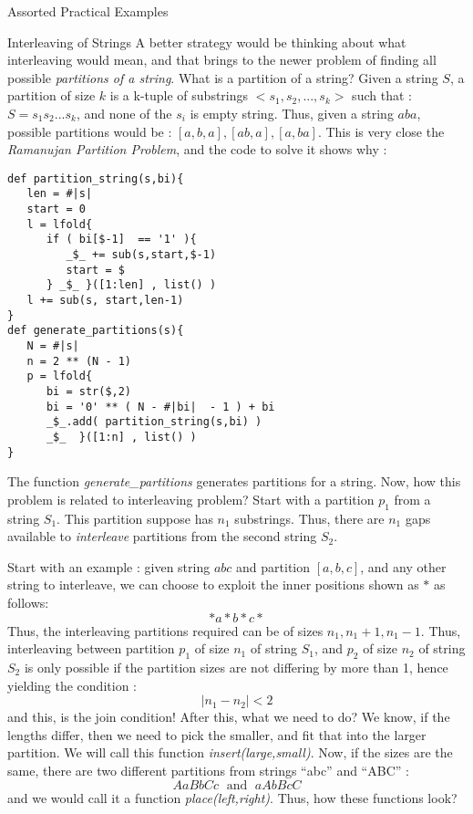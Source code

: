 \begin{section}{Assorted Practical Examples}
\begin{subsection}{Interleaving of Strings}
A better strategy would be thinking about what interleaving would mean,
and that brings to the newer problem of finding all possible \emph{partitions of a string}.
What is a partition of a string? Given a string $S$, a partition of size $k$ is a k-tuple 
of substrings $<s_1, s_2,...,s_k>$ such that  : $S = s_1s_2...s_k$, 
and none of the $s_i$ is empty string. Thus, given a string $aba$, possible partitions would be :
$[a,b,a], [ab,a], [a,ba] $. This is very close the \emph{Ramanujan Partition Problem}, and 
the code to solve it shows why :
 
\begin{center}\begin{minipage}{\linewidth}
\begin{lstlisting}[style=JexlStyle]
def partition_string(s,bi){
   len = #|s| 
   start = 0 
   l = lfold{
      if ( bi[$-1]  == '1' ){
         _$_ += sub(s,start,$-1) 
         start = $ 
      } _$_ }([1:len] , list() )
   l += sub(s, start,len-1) 
}
def generate_partitions(s){
   N = #|s|
   n = 2 ** (N - 1)
   p = lfold{
      bi = str($,2)
      bi = '0' ** ( N - #|bi|  - 1 ) + bi 
      _$_.add( partition_string(s,bi) ) 
      _$_  }([1:n] , list() )
}
\end{lstlisting}  
\end{minipage}\end{center}
The function \emph{generate\_partitions} generates partitions 
for a string. Now, how this problem is related to interleaving problem?
Start with a partition $p_1$ from a string $S_1$.
This partition suppose has $n_1$ substrings. Thus, there are $n_1$ gaps 
available to \emph{interleave} partitions from the second string $S_2$.

Start with an example : given string $abc$ and partition $[a,b,c]$, 
and any other string to interleave, we can choose to exploit the inner positions shown as $*$ as follows:
$$
* a * b * c * 
$$   
Thus, the interleaving partitions required can be of sizes $n_1, n_1+1, n_1 - 1$.
Thus, interleaving between partition $p_1$ of size $n_1$ of string $S_1$, 
and $p_2$ of size $n_2$ of string $S_2$ is only possible if the partition sizes 
are not differing by more than 1, hence yielding the condition : 
$$
|n_1 - n_2 | < 2 
$$
and this, is the  join condition! After this, what we need to do?
We know, if the lengths differ, then we need to pick the smaller, 
and fit that into the larger partition. We will call this function \emph{insert(large,small)}.
Now, if the sizes are the same, there are two different partitions from strings 
``abc'' and ``ABC'' :
$$
A a B b C c  \; \text{ and } \; a A b B c C   
$$   
and we would call it a function \emph{place(left,right)}. 
Thus, how these functions look?


\end{subsection}
\end{section}
